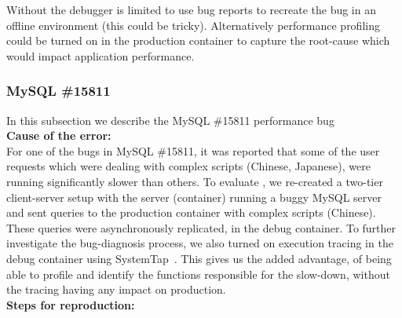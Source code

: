 Without \parikshan the debugger is limited to use bug reports to recreate the bug in an offline environment (this could be tricky). Alternatively performance profiling could be turned on in the production container to capture the root-cause which would impact application performance.\\

\subsubsection{MySQL \#15811}
\label{sec:mySQL15811}

In this subsection we describe the MySQL \#15811 performance bug \\

\noindent \textbf{Cause of the error:} \\

For one of the bugs in  MySQL \#15811, it was reported that some of the user requests which were dealing with complex scripts (Chinese, Japanese), were running significantly slower than others.
To evaluate \parikshan, we re-created a two-tier client-server setup with the server (container) running a buggy MySQL server and sent queries to the production container with complex scripts (Chinese).
These queries were asynchronously replicated, in the debug container. To further investigate the bug-diagnosis process, we also turned on execution tracing in the debug container using SystemTap~\cite{systemtap}.
This gives us the added advantage, of being able to profile and identify the functions responsible for the slow-down, without the tracing having any impact on production.\\

\noindent \textbf{Steps for reproduction:} \\

